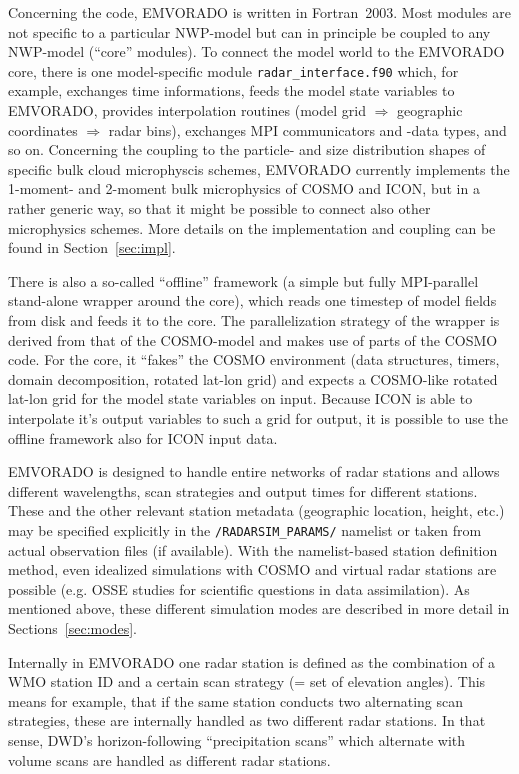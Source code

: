 \documentclass[10pt,a4paper,twoside,headinclude,footinclude,parskip=half]{scrartcl}
\newcommand{\srcform}[1]{\mbox{\texttt{#1}}\xspace}%
\begin{document}
Concerning the code, EMVORADO is written in Fortran~2003. Most modules are not specific
to a particular NWP-model but can in principle be coupled to any NWP-model (``core'' modules).
To connect the model world to the EMVORADO core, there is one model-specific
module \srcform{radar_interface.f90} which, for example, exchanges time informations, feeds the model state variables to EMVORADO,
provides interpolation routines (model grid $\Longrightarrow$ geographic coordinates $\Longrightarrow$ radar bins),
exchanges MPI communicators and -data types, and so on. Concerning the coupling to the particle- and size distribution shapes of specific bulk cloud microphyscis schemes,
EMVORADO currently implements the 1-moment- and 2-moment bulk microphysics of COSMO and ICON, but in a rather generic way, so that it might be
possible to connect also other microphysics schemes.
More details on the implementation
and coupling can be found in Section~\ref{sec:impl}.

There is also a so-called ``offline'' framework (a simple but fully MPI-parallel stand-alone wrapper around the core), which reads
one timestep of model fields from disk and feeds it to the core. The parallelization strategy of the wrapper is derived from
that of the COSMO-model and makes use of parts of the COSMO code. For the core, it ``fakes'' the COSMO environment (data structures,
timers, domain decomposition, rotated lat-lon grid) and expects a COSMO-like rotated lat-lon grid for the model state variables on input.
Because ICON is able to interpolate it's output variables to such a grid for output, it is possible to use the offline framework also for ICON input data.

EMVORADO is designed to handle entire networks of radar stations and allows different
wavelengths, scan strategies and output times for different stations. These and the
other relevant station metadata (geographic location, height, etc.) may be specified
explicitly in the \srcform{/RADARSIM_PARAMS/} namelist or taken from actual
observation files (if available). With the namelist-based station definition method,
even idealized simulations with COSMO and virtual radar stations are possible
(e.g. OSSE studies for scientific questions in data assimilation).
As mentioned above, these different simulation modes are described in more detail in Sections~\ref{sec:modes}.

Internally in EMVORADO one radar station is defined as the combination of a WMO station ID and a certain scan strategy (= set of elevation angles).
This means for example, that if the same station conducts two alternating scan strategies, these are internally handled as two different radar stations.
In that sense, DWD's horizon-following ``precipitation scans'' which alternate with volume scans are handled as different radar stations.
\end{document}
